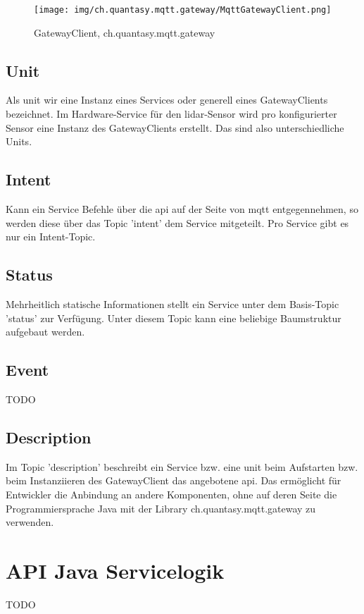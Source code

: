 \begin{figure}[H]
	\centering
	\texttt{[image: img/ch.quantasy.mqtt.gateway/MqttGatewayClient.png]}
    \caption{GatewayClient, ch.quantasy.mqtt.gateway\cite{ch.quantasy.mqtt.gateway}}
    \label{fig:gatewayclient}
\end{figure}



\subsection{Unit}
Als \gls{unit} wir eine Instanz eines Services oder generell eines GatewayClients bezeichnet. Im Hardware-Service für den \acrshort{lidar}-Sensor wird pro konfigurierter Sensor eine Instanz des GatewayClients erstellt. Das sind also unterschiedliche Units.
\subsection{Intent}
Kann ein Service Befehle über die \acrshort{api} auf der Seite von \acrshort{mqtt} entgegennehmen, so werden diese über das Topic '\gls{intent}' dem Service mitgeteilt. Pro Service gibt es nur ein Intent-Topic.
\subsection{Status}
Mehrheitlich statische Informationen stellt ein Service unter dem Basis-Topic '\gls{status}' zur Verfügung. Unter diesem Topic kann eine beliebige Baumstruktur aufgebaut werden.
\subsection{Event}
TODO
\subsection{Description}
Im Topic '\gls{description}' beschreibt ein Service bzw. eine \acrshort{unit} beim Aufstarten bzw. beim Instanziieren des GatewayClient das angebotene \acrshort{api}. Das ermöglicht für Entwickler die Anbindung an andere Komponenten, ohne auf deren Seite die Programmiersprache Java mit der Library ch.quantasy.mqtt.gateway\cite{ch.quantasy.mqtt.gateway} zu verwenden.

\section{API Java Servicelogik}

TODO

